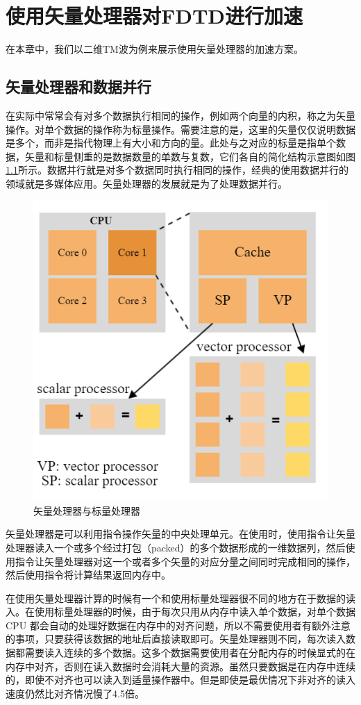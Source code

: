 
\chapter{使用矢量处理器对FDTD进行加速}

在本章中，我们以二维TM波为例来展示使用矢量处理器的加速方案。

\section{矢量处理器和数据并行}

在实际中常常会有对多个数据执行相同的操作，例如两个向量的内积，称之为矢量操作。对单个数据的操作称为标量操作。需要注意的是，这里的矢量仅仅说明数据是多个，而非是指代物理上有大小和方向的量。此处与之对应的标量是指单个数据，矢量和标量侧重的是数据数量的单数与复数，它们各自的简化结构示意图如图\ref{ch3:vectorprocessor}所示。数据并行就是对多个数据同时执行相同的操作，经典的使用数据并行的领域就是多媒体应用。矢量处理器的发展就是为了处理数据并行。

\begin{figure}[hp]
\centering
\includegraphics[width=0.7\linewidth]{pics/vectorprocessor}
\caption{矢量处理器与标量处理器}
\label{ch3:vectorprocessor}
\end{figure}


矢量处理器是可以利用指令操作矢量的中央处理单元。在使用时，使用指令让矢量处理器读入一个或多个经过打包（packed）的多个数据形成的一维数据列，然后使用指令让矢量处理器对这一个或者多个矢量的对应分量之间同时完成相同的操作，然后使用指令将计算结果返回内存中。

在使用矢量处理器计算的时候有一个和使用标量处理器很不同的地方在于数据的读入。在使用标量处理器的时候，由于每次只用从内存中读入单个数据，对单个数据 CPU 都会自动的处理好数据在内存中的对齐问题，所以不需要使用者有额外注意的事项，只要获得该数据的地址后直接读取即可。矢量处理器则不同，每次读入数据都需要读入连续的多个数据。这多个数据需要使用者在分配内存的时候显式的在内存中对齐，否则在读入数据时会消耗大量的资源。虽然只要数据是在内存中连续的，即使不对齐也可以读入到适量操作器中。但是即使是最优情况下非对齐的读入速度仍然比对齐情况慢了4.5倍。

